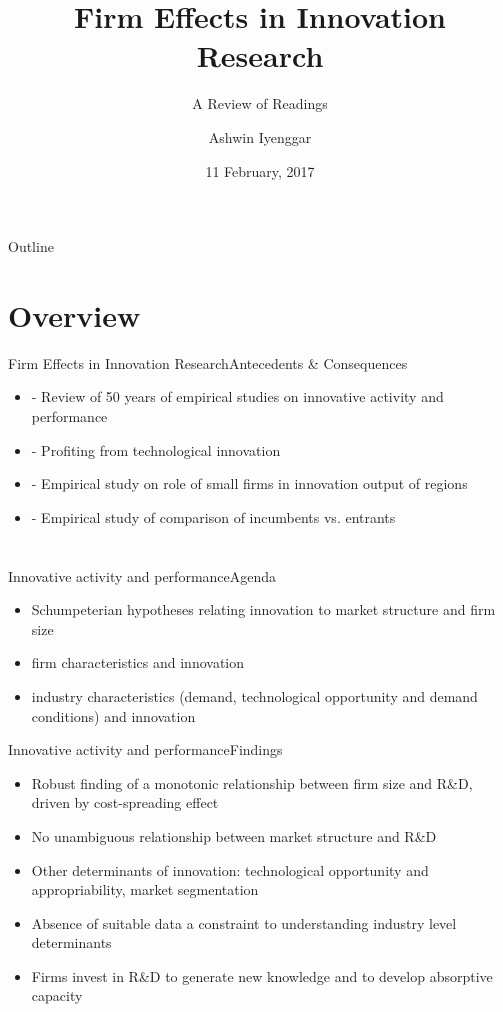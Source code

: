 \documentclass{beamer}
\title{Firm Effects in Innovation Research}
\subtitle{A Review of Readings}
\author{Ashwin Iyenggar}
\institute[Indian Institute of Management Bangalore] 
{
  Corporate Strategy and Policy\\
  Indian Institute of Management Bangalore
}
\date{11 February, 2017}
\begin{document}
\begin{frame}
  \titlepage
\end{frame}

\begin{frame}{Outline}
  \tableofcontents
\end{frame}

\section{Overview}
\begin{frame}{Firm Effects in Innovation Research}{Antecedents \& Consequences}
\begin{itemize}
\item{\cite{Cohen2010} - Review of 50 years of empirical studies on innovative activity and performance}
\item{\cite{Teece1986} - Profiting from technological innovation}
\item{\cite{Agrawal2014} - Empirical study on role of small firms in innovation output of regions}
\item{\cite{igami2015} - Empirical study of comparison of incumbents vs. entrants}
\end{itemize}
\end{frame}



\section{\cite{Cohen2010}}
\begin{frame}{Innovative activity and performance}{Agenda}
\begin{itemize}
\item{Schumpeterian hypotheses relating innovation to market structure and firm size}
\item{firm characteristics and innovation}
\item{industry characteristics (demand, technological opportunity and demand conditions) and innovation}
\end{itemize}
\end{frame}

\begin{frame}{Innovative activity and performance}{Findings}
\begin{itemize}
\item{Robust finding of a monotonic relationship between firm size and R\&D, driven by cost-spreading effect}
\item{No unambiguous relationship between market structure and R\&D}
\item{Other determinants of innovation: technological opportunity and appropriability, market segmentation}
\item{Absence of suitable data a constraint to understanding industry level determinants}
\item{Firms invest in R\&D to generate new knowledge and to develop absorptive capacity}
\end{itemize}
\end{frame}
\end{document}

